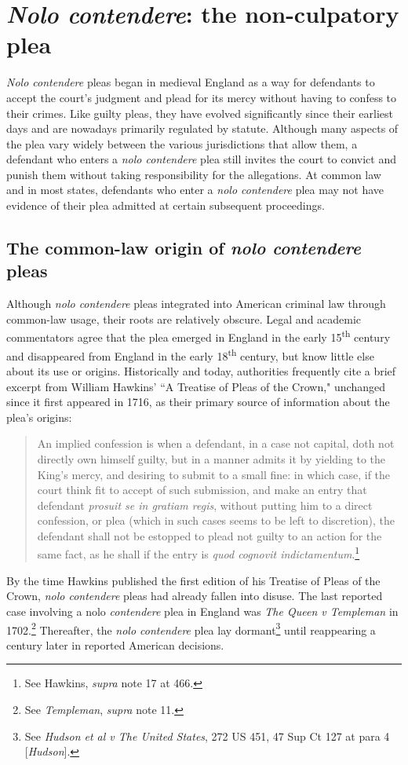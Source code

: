 \section{\textit{Nolo contendere}: the non-culpatory plea}

\textit{Nolo contendere} pleas began in medieval England as a way for defendants to accept the court's judgment and plead for its mercy without having to confess to their crimes. Like guilty pleas, they have evolved significantly since their earliest days and are nowadays primarily regulated by statute. Although many aspects of the plea vary widely between the various jurisdictions that allow them, a defendant who enters a \textit{nolo contendere} plea still invites the court to convict and punish them without taking responsibility for the allegations. At common law and in most states, defendants who enter a \textit{nolo contendere} plea may not have evidence of their plea admitted at certain subsequent proceedings. 

\subsection{The common-law origin of \textit{nolo contendere} pleas}

Although \textit{nolo contendere} pleas integrated into American criminal law through common-law usage, their roots are relatively obscure. Legal and academic commentators agree that the plea emerged in England in the early 15\textsuperscript{th} century and disappeared from England in the early 18\textsuperscript{th} century, but know little else about its use or origins. Historically and today, authorities frequently cite a brief excerpt from William Hawkins' ``A Treatise of Pleas of the Crown," unchanged since it first appeared in 1716, as their primary source of information about the plea's origins:

\begin{quote}
\singlespacing
An implied confession is when a defendant, in a case not capital, doth not directly own himself guilty, but in a manner admits it by yielding to the King's mercy, and desiring to submit to a small fine: in which case, if the court think fit to accept of such submission, and make an entry that defendant \textit{prosuit se in gratiam regis}, without putting him to a direct confession, or plea (which in such cases seems to be left to discretion), the defendant shall not be estopped to plead not guilty to an action for the same fact, as he shall if the entry is \textit{quod cognovit indictamentum}.\footnote{See Hawkins, \textit{supra} note 17 at 466.}
\end{quote}
By the time Hawkins published the first edition of his Treatise of Pleas of the Crown, \textit{nolo contendere} pleas had already fallen into disuse. The last reported case involving a nolo\textit{ contendere} plea in England was \textit{The Queen v Templeman} in 1702.\footnote{See \textit{Templeman}, \textit{supra} note 11.} Thereafter, the \textit{nolo contendere} plea lay dormant\footnote{See \textit{Hudson et al v The United States}, 272 US 451, 47 Sup Ct 127 at para 4 [\textit{Hudson}].} until reappearing a century later in reported American decisions.

